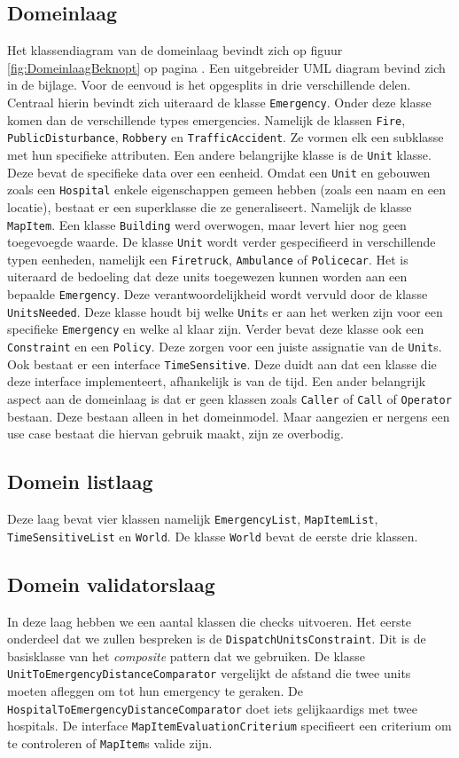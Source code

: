 \subsection{Domeinlaag}
 Het klassendiagram van de domeinlaag bevindt zich op figuur \ref{fig:DomeinlaagBeknopt} op pagina \pageref{fig:DomeinlaagBeknopt}. Een uitgebreider UML diagram bevind zich in de bijlage. Voor de eenvoud is het opgesplits in drie verschillende delen. Centraal hierin bevindt zich uiteraard de klasse \texttt{Emergency}. Onder deze klasse komen dan de verschillende types emergencies. Namelijk de klassen \texttt{Fire}, \texttt{PublicDisturbance}, \texttt{Robbery} en \texttt{TrafficAccident}. Ze vormen elk een subklasse met hun specifieke attributen. Een andere belangrijke klasse is de \texttt{Unit} klasse. Deze bevat de specifieke data over een eenheid. Omdat een \texttt{Unit} en gebouwen zoals een \texttt{Hospital} enkele eigenschappen gemeen hebben (zoals een naam en een locatie), bestaat er een superklasse die ze generaliseert. Namelijk de klasse \texttt{MapItem}. Een klasse \texttt{Building} werd overwogen, maar levert hier nog geen toegevoegde waarde. De klasse \texttt{Unit} wordt verder gespecifieerd in verschillende typen eenheden, namelijk een \texttt{Firetruck}, \texttt{Ambulance} of \texttt{Policecar}. Het is uiteraard de bedoeling dat deze units toegewezen kunnen worden aan een bepaalde \texttt{Emergency}. Deze verantwoordelijkheid wordt vervuld door de klasse \texttt{UnitsNeeded}. Deze klasse houdt bij welke \texttt{Unit}s  er aan het werken zijn voor een specifieke \texttt{Emergency} en welke al klaar zijn. Verder bevat deze klasse ook een \texttt{Constraint} en een \texttt{Policy}. Deze zorgen voor een juiste assignatie van de \texttt{Unit}s. Ook bestaat er een interface \texttt{TimeSensitive}. Deze duidt aan dat een klasse die deze interface implementeert, afhankelijk is van de tijd. Een ander belangrijk aspect aan de domeinlaag is dat er geen klassen zoals \texttt{Caller} of \texttt{Call} of \texttt{Operator} bestaan. Deze bestaan alleen in het domeinmodel. Maar aangezien er nergens een use case bestaat die hiervan gebruik maakt, zijn ze overbodig.
\subsection{Domein listlaag}
Deze laag bevat vier klassen namelijk \texttt{EmergencyList}, \texttt{MapItemList}, \texttt{TimeSensitiveList} en \texttt{World}. De klasse \texttt{World} bevat de eerste drie klassen.
\subsection{Domein validatorslaag}
In deze laag hebben we een aantal klassen die checks uitvoeren. Het eerste onderdeel dat we zullen bespreken is de \texttt{DispatchUnitsConstraint}. Dit is de basisklasse van het \textit{composite} pattern dat we gebruiken. De klasse \texttt{UnitToEmergencyDistanceComparator} vergelijkt de afstand die twee units moeten afleggen om tot hun emergency te geraken. De \texttt{HospitalToEmergencyDistanceComparator} doet iets gelijkaardigs met twee hospitals. De interface \texttt{MapItemEvaluationCriterium} specifieert een criterium om te controleren of \texttt{MapItem}s valide zijn.
